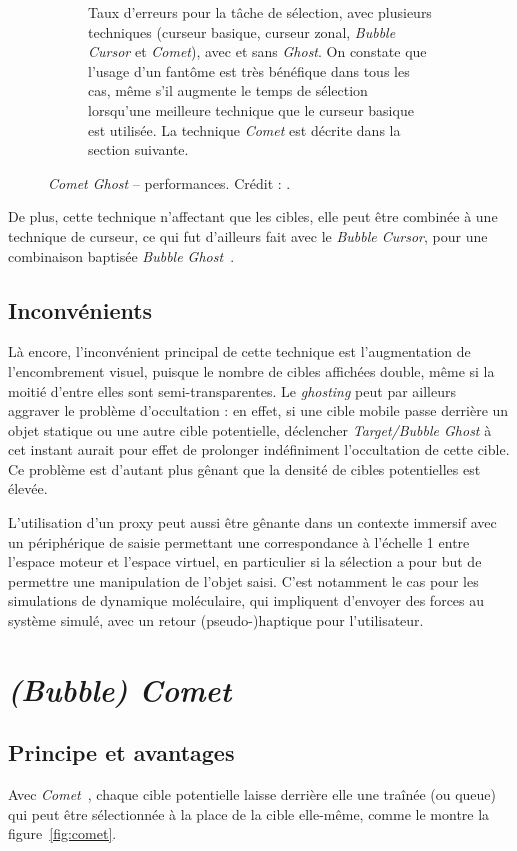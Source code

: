 \begin{figure}[!htb]
\begin{subfigure}[t]{0.49\textwidth}
			\caption{Taux d'erreurs pour la tâche de sélection, avec plusieurs techniques (curseur basique, curseur zonal, \emph{Bubble Cursor} et \emph{Comet}), avec et sans \emph{Ghost}. On constate que l'usage d'un fantôme est très bénéfique dans tous les cas, même s'il augmente le temps de sélection lorsqu'une meilleure technique que le curseur basique est utilisée. La technique \emph{Comet} est décrite dans la section suivante.}
			\label{fig:cometGhostErrors}
		\end{subfigure}
		\caption[\emph{Comet Ghost} -- temps de sélection et taux d'erreurs]{\emph{Comet Ghost} -- performances. Crédit : \cite{hasan2011comet}.}
		\label{fig:cometGhostTimeErrors}
	\end{figure}
		
	De plus, cette technique n'affectant que les cibles, elle peut être combinée à une technique de curseur, ce qui fut d'ailleurs fait avec le \emph{Bubble Cursor}, pour une combinaison baptisée \emph{Bubble Ghost}~\cite{hasan2011comet}.
		
	\subsection{Inconvénients}
	Là encore, l'inconvénient principal de cette technique est l'augmentation de l'encombrement visuel, puisque le nombre de cibles affichées double, même si la moitié d'entre elles sont semi-transparentes. Le \emph{ghosting} peut par ailleurs aggraver le problème d'occultation : en effet, si une cible mobile passe derrière un objet statique ou une autre cible potentielle, déclencher \emph{Target/Bubble Ghost} à cet instant aurait pour effet de prolonger indéfiniment l'occultation de cette cible. Ce problème est d'autant plus gênant que la densité de cibles potentielles est élevée.
		
	L'utilisation d'un proxy peut aussi être gênante dans un contexte immersif avec un périphérique de saisie permettant une correspondance à l'échelle 1 entre l'espace moteur et l'espace virtuel, en particulier si la sélection a pour but de permettre une manipulation de l'objet saisi. C'est notamment le cas pour les simulations de dynamique moléculaire, qui impliquent d'envoyer des forces au système simulé, avec un retour (pseudo-)haptique pour l'utilisateur.

\section{\emph{(Bubble) Comet}}
	\subsection{Principe et avantages}
	Avec \emph{Comet}~\cite{hasan2011comet}, chaque cible potentielle laisse derrière elle une traînée (ou queue) qui peut être sélectionnée à la place de la cible elle-même, comme le montre la figure~\ref{fig:comet}.

